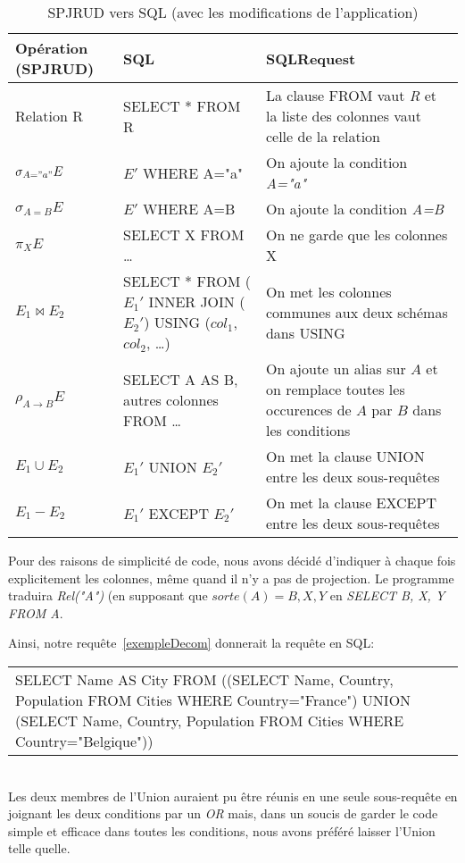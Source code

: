 \documentclass[]{article}
\begin{document}
\begin{table}[H]
	\centering
	\begin{tabular}{| l | p{100px} | p{100px} |}
		\hline
		Op\'eration (SPJRUD) & SQL & SQLRequest\\
		\hline
		Relation R & SELECT * FROM R & La clause FROM vaut \textit{R} et la liste des colonnes vaut celle de la relation\\
		\hline
		$\sigma_{A="a"} E$ & $E'$ WHERE A="a" & On ajoute la condition \textit{A="a"}\\
		\hline
		$\sigma_{A=B} E$ & $E'$ WHERE A=B & On ajoute la condition \textit{A=B}\\
		\hline
		$\pi_X E$ & SELECT X FROM \ldots & On ne garde que les colonnes X\\
		\hline
		$E_1 \bowtie E_2$ & SELECT * FROM ($E_1'$ INNER JOIN ($E_2'$) USING ($col_1$, $col_2$, \ldots) & On met les colonnes communes aux deux sch\'emas dans USING \\
		\hline
		$\rho_{A \to B} E$ & SELECT A AS B, autres colonnes FROM \ldots & On ajoute un alias sur $A$ et on remplace toutes les occurences de $A$ par $B$ dans les conditions\\
		\hline
		$E_1 \cup E_2$ & $E_1'$ UNION $E_2'$ & On met la clause UNION entre les deux sous-requ\^etes\\
		\hline
		$E_1 - E_2$ & $E_1'$ EXCEPT $E_2'$ & On met la clause EXCEPT entre les deux sous-requ\^etes\\
		\hline
	\end{tabular}
	\caption{SPJRUD vers SQL (avec les modifications de l'application)}
\end{table}

Pour des raisons de simplicit\'e de code, nous avons d\'ecid\'e d'indiquer \`a chaque fois explicitement les colonnes, m\^eme quand il n'y a pas de projection. Le programme traduira \textit{Rel("A")} (en supposant que $sorte(A)={B, X, Y}$ en \textit{SELECT B, X, Y FROM A}.

Ainsi, notre requ\^ete~\ref{exempleDecom} donnerait la requ\^ete en SQL:\\

\begin{tabular}{p{275px}}
	SELECT Name AS City FROM ((SELECT Name, Country, Population FROM Cities WHERE Country="France") UNION (SELECT Name, Country, Population FROM Cities WHERE Country="Belgique"))
\end{tabular}
\\

Les deux membres de l'Union auraient pu \^etre r\'eunis en une seule sous-requ\^ete en joignant les deux conditions par un \textit{OR} mais, dans un soucis de garder le code simple et efficace dans toutes les conditions, nous avons pr\'ef\'er\'e laisser l'Union telle quelle.
\end{document}
